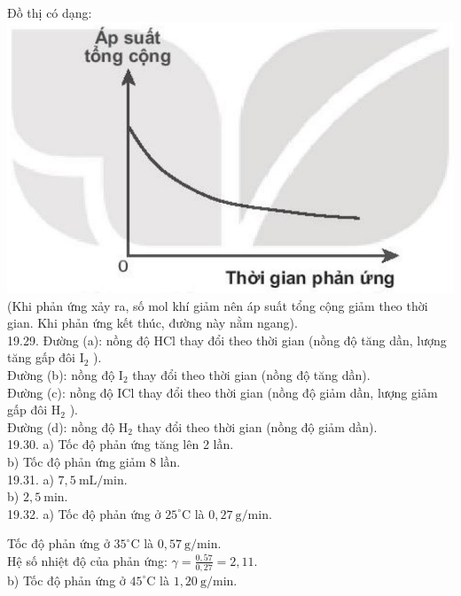 \documentclass[10pt]{article}
\begin{document}
Đồ thị có dạng:\\
\includegraphics[max width=\textwidth, center]{2025_10_23_ee735750217b2aca435cg-46}\\
(Khi phản ứng xảy ra, số mol khí giảm nên áp suất tổng cộng giảm theo thời gian. Khi phản ứng kết thúc, đường này nằm ngang).\\
19.29. Đường (a): nồng độ HCl thay đổi theo thời gian (nồng độ tăng dần, lượng tăng gấp đôi $\mathrm{I}_{2}$ ).\\
Đường (b): nồng độ $\mathrm{I}_{2}$ thay đổi theo thời gian (nồng độ tăng dần).\\
Đường (c): nồng độ ICl thay đổi theo thời gian (nồng độ giảm dần, lượng giảm gấp đôi $\mathrm{H}_{2}$ ).\\
Đường (d): nồng độ $\mathrm{H}_{2}$ thay đổi theo thời gian (nồng độ giảm dần).\\
19.30. a) Tốc độ phản ứng tăng lên 2 lần.\\
b) Tốc độ phản ứng giảm 8 lần.\\
19.31. a) $7,5 \mathrm{~mL} / \mathrm{min}$.\\
b) $2,5 \mathrm{~min}$.\\
19.32. a) Tốc độ phản ứng ở $25^{\circ} \mathrm{C}$ là $0,27 \mathrm{~g} / \mathrm{min}$.

Tốc độ phản ứng ở $35^{\circ} \mathrm{C}$ là $0,57 \mathrm{~g} / \mathrm{min}$.\\
Hệ số nhiệt độ của phản ứng: $\gamma=\frac{0,57}{0,27}=2,11$.\\
b) Tốc độ phản ứng ở $45^{\circ} \mathrm{C}$ là $1,20 \mathrm{~g} / \mathrm{min}$.
\end{document}
